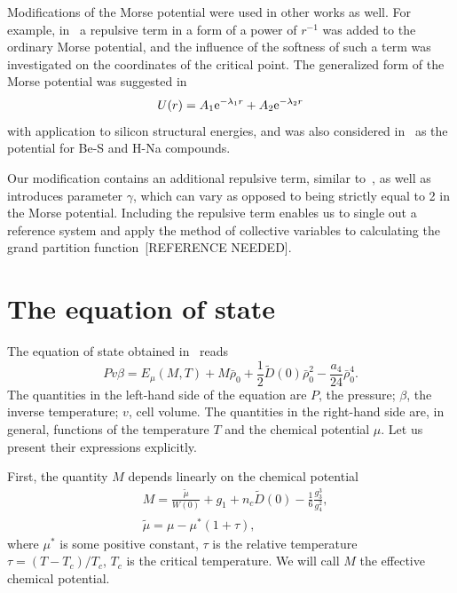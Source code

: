 \documentclass[12pt]{article}
\begin{document}
	Modifications of the Morse potential were used in other works as well. For example, in~\cite{MartinezValenciaEtAl2013} a repulsive term in a form of a power of $r^{-1}$ was added to the ordinary Morse potential, and the influence of the softness of such a term was investigated on the coordinates of the critical point. The generalized form of the Morse potential was suggested in~\cite{BiswasHamann1985}
	\begin{equation}
		U(r) = A_1 {\rm e}^{-\lambda_1 r} + A_2 {\rm e}^{-\lambda_2 r}
	\end{equation} 
	with application to silicon structural energies, and was also considered in~\cite{Lim2005} as the potential for Be-S and H-Na compounds.
	
	Our modification contains an additional repulsive term, similar to~\cite{MartinezValenciaEtAl2013}, as well as introduces parameter $\gamma$, which can vary as opposed to being strictly equal to 2 in the Morse potential. Including the repulsive term enables us to single out a reference system and apply the method of collective variables to calculating the grand partition function~[REFERENCE NEEDED].
	
	\section{The equation of state}
	The equation of state obtained in~\cite{KozlovskiiDobush2020} reads
	\begin{equation}
		\label{eq:eos}
		Pv\beta = E_\mu(M, T) + M \bar \rho_0 + \frac{1}{2} \tilde D(0) \bar \rho_0^2 - \frac{a_4}{24} \bar \rho_0^4.
	\end{equation}
	The quantities in the left-hand side of the equation are $P$, the pressure; $\beta$, the inverse temperature; $v$, cell volume. The quantities in the right-hand side are, in general, functions of the temperature $T$ and the chemical potential $\mu$. Let us present their expressions explicitly.
	
	First, the quantity $M$ depends linearly on the chemical potential
	\begin{align}\label{chem_pot}
		&	M = \frac{\tilde\mu}{W(0)} + g_1 + n_c \tilde D(0) - \frac{1}{6} \frac{g_3^3}{g_4^2}, \\
		&	\tilde\mu=\mu-\mu^*(1+\tau),
	\end{align}
	where $\mu^*$ is some positive constant, $\tau$ is the relative temperature $\tau = (T - T_c) / T_c$, $T_c$ is the critical temperature. We will call $M$ the effective chemical potential.
	
\end{document}
